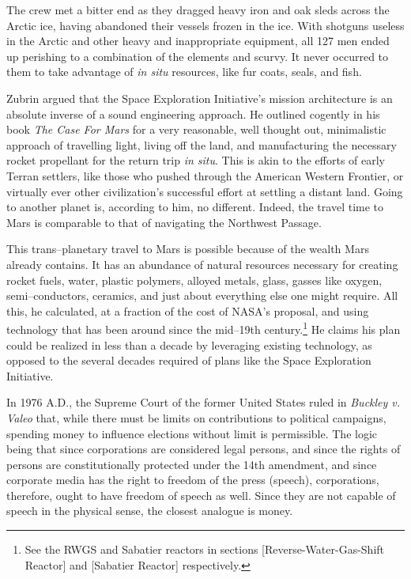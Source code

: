 The crew met a bitter end as they dragged heavy iron and oak sleds across the Arctic ice, having abandoned their vessels frozen in the ice. With shotguns useless in the Arctic and other heavy and inappropriate equipment, all 127 men ended up perishing to a combination of the elements and scurvy. It never occurred to them to take advantage of {\it in situ} resources, like fur coats, seals, and fish.

Zubrin argued that the Space Exploration Initiative's mission architecture is an absolute inverse of a sound engineering approach. He outlined cogently in his book {\it The Case For Mars} for a very reasonable, well thought out, minimalistic approach of travelling light, living off the land, and manufacturing the necessary rocket propellant for the return trip {\it in situ}. This is akin to the efforts of early Terran settlers, like those who pushed through the American Western Frontier, or virtually ever other civilization's successful effort at settling a distant land. Going to another planet is, according to him, no different. Indeed, the travel time to Mars is comparable to that of navigating the Northwest Passage.

This trans--planetary travel to Mars is possible because of the wealth Mars already contains. It has an abundance of natural resources necessary for creating rocket fuels, water, plastic polymers, alloyed metals, glass, gasses like oxygen, semi--conductors, ceramics, and just about everything else one might require. All this, he calculated, at a fraction of the cost of NASA's proposal, and using technology that has been around since the mid--19th century.\footnote{See the RWGS and Sabatier reactors in sections \in{}[Reverse-Water-Gas-Shift Reactor] and \in{}[Sabatier Reactor] respectively.} He claims his plan could be realized in less than a decade by leveraging existing technology, as opposed to the several decades required of plans like the Space Exploration Initiative.

In 1976 A.D., the Supreme Court of the former United States ruled in {\it Buckley v. Valeo} that, while there must be limits on contributions to political campaigns, spending money to influence elections without limit is permissible. The logic being that since corporations are considered legal persons, and since the rights of persons are constitutionally protected under the 14th amendment, and since corporate media has the right to freedom of the press (speech), corporations, therefore, ought to have freedom of speech as well. Since they are not capable of speech in the physical sense, the closest analogue is money.

